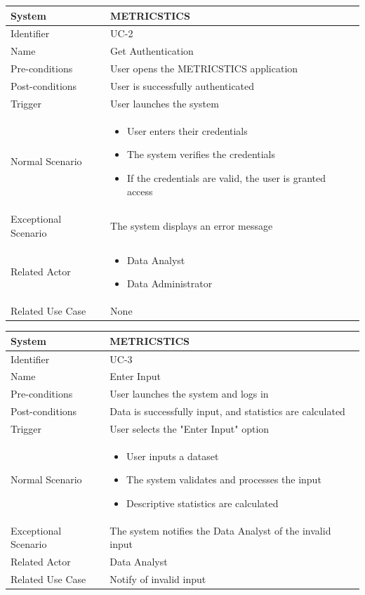 \documentclass[letterpaper,12pt]{article}
\begin{document}
\begin{itemize}
\begin{tabular}{|p{1.45in}|p{3.65in}|}
    \hline
    System & METRICSTICS \\
    \hline
    Identifier & UC-2 \\
    \hline
    Name & Get Authentication \\
    \hline
    Pre-conditions & User opens the METRICSTICS application\\
   \hline
    Post-conditions & User is successfully authenticated \\
   \hline
    Trigger & User launches the system \\
    \hline
    Normal Scenario &  \begin{itemize}
   \item User enters their credentials
   \item The system verifies the credentials
   \item If the credentials are valid, the user is granted access
   \end{itemize}\\
    \hline
    Exceptional Scenario & The system displays an error message \\
    \hline
    Related Actor& \begin{itemize}
   \item Data Analyst
   \item Data Administrator
   \end{itemize}\\
    \hline
    Related Use Case & None\\
\hline
\end{tabular}
\bigskip
\bigskip

\begin{tabular}{|p{1.45in}|p{3.65in}|}
    \hline
    System & METRICSTICS \\
    \hline
    Identifier & UC-3 \\
    \hline
    Name & Enter Input \\
    \hline
    Pre-conditions & User launches the system and logs in\\
   \hline
    Post-conditions & Data is successfully input, and statistics are calculated\\
   \hline
    Trigger & User selects the "Enter Input" option \\
    \hline
    Normal Scenario &  \begin{itemize}
   \item User inputs a dataset
   \item The system validates and processes the input
   \item Descriptive statistics are calculated
   \end{itemize}\\
    \hline
    Exceptional Scenario & The system notifies the Data Analyst of the invalid input \\
    \hline
    Related Actor& Data Analyst\\
    \hline
    Related Use Case & Notify of invalid input\\
\hline
\end{tabular}
\bigskip
\bigskip


\end{itemize}
\end{document}
